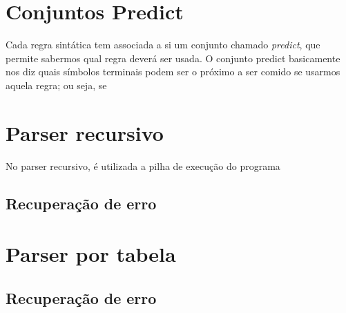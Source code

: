 \section{Conjuntos Predict}
Cada regra sintática tem associada a si um conjunto chamado \textit{predict}, que permite sabermos qual regra deverá ser usada. O conjunto predict basicamente nos diz quais símbolos terminais podem ser o próximo a ser comido se usarmos aquela regra; ou seja, se 

\section{Parser recursivo}
No parser recursivo, é utilizada a pilha de execução do programa 

\subsection{Recuperação de erro}

\section{Parser por tabela}

\subsection{Recuperação de erro}